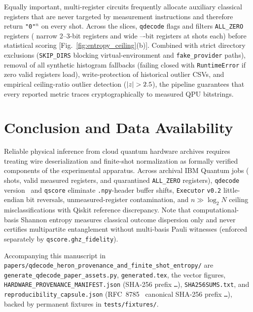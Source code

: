 \documentclass[twocolumn,aps,prapplied,superscriptaddress,floatfix]{revtex4-2}
\begin{document}
Equally important, multi-register circuits frequently allocate auxiliary classical registers that are never targeted by measurement instructions and therefore return \texttt{"0"$^n$} on every shot. Across the \QdTotalSlices{} slices, \texttt{qdecode} flags and filters \QdAllZeroSlices{} \texttt{ALL\_ZERO} registers (\QdAllZeroNarrow{} narrow 2--3-bit registers and \QdAllZeroWide{} wide \QdAllZeroWideMinBits{}--\QdAllZeroWideMaxBits{}-bit registers at \QdAllZeroShots{} shots each) before statistical scoring [Fig.~\ref{fig:entropy_ceiling}(b)]. Combined with strict directory exclusions (\texttt{SKIP\_DIRS} blocking virtual-environment and \texttt{fake\_provider} paths), removal of all synthetic histogram fallbacks (failing closed with \texttt{RuntimeError} if zero valid registers load), write-protection of historical outlier CSVs, and empirical ceiling-ratio outlier detection ($\lvert z \rvert > 2.5$), the pipeline guarantees that every reported metric traces cryptographically to measured QPU bitstrings.

\section{Conclusion and Data Availability}\label{sec:data}

Reliable physical inference from cloud quantum hardware archives requires treating wire deserialization and finite-shot normalization as formally verified components of the experimental apparatus. Across \QdTotalJobs{} archival IBM Quantum jobs (\QdTotalCorpusShots{} shots, \QdValidSlices{} valid measured registers, and \QdAllZeroSlices{} quarantined \texttt{ALL\_ZERO} registers), \texttt{qdecode} version~\texttt{\QdDecoderVersion} and \texttt{qscore} eliminate \texttt{.npy}-header buffer shifts, \texttt{Executor} \texttt{v0.2} little-endian bit reversals, unmeasured-register contamination, and $n \gg \log_2 N$ ceiling misclassifications with \QdRefParityTvd{} Qiskit reference discrepancy. Note that computational-basis Shannon entropy measures classical outcome dispersion only and never certifies multipartite entanglement without multi-basis Pauli witnesses (enforced separately by \texttt{qscore.ghz\_fidelity}).

Accompanying this manuscript in \texttt{papers/qdecode\_heron\_provenance\_and\_finite\_shot\_entropy/} are \texttt{generate\_qdecode\_paper\_assets.py}, \texttt{generated.tex}, the vector figures, \texttt{HARDWARE\_PROVENANCE\_MANIFEST.json} (SHA-256 prefix \texttt{\QdManifestShaPrefix\ldots}), \texttt{SHA256SUMS.txt}, and \texttt{reproducibility\_capsule.json} (RFC~8785~\cite{rfc8785} canonical SHA-256 prefix \texttt{\QdCapsuleShaPrefix\ldots}), backed by \QdPermanentFixtures{} permanent fixtures in \texttt{tests/fixtures/}.
\end{document}
